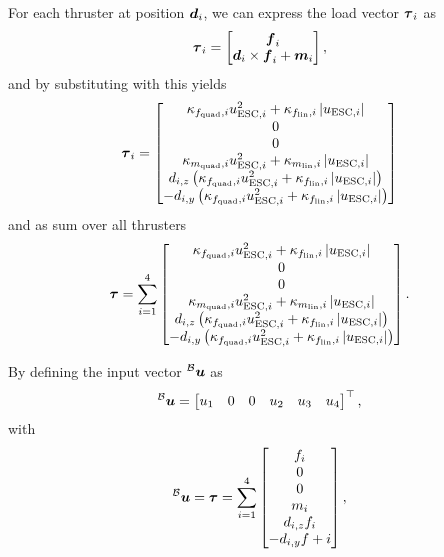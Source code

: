 For each thruster at position $\mbox{$\bm{d}$}_{i}$, we can express the load vector $\mbox{$\bm{\tau}$}_{i}$ as
\begin{equation}
	\label{eq:load-per-thruster-short}
	\mbox{$\bm{\tau}$}_{i} = 
	\begin{bmatrix}
		\mbox{$\bm{f}$}_i \\
		\mbox{$\bm{d}$}_i \times \mbox{$\bm{f}$}_i + \mbox{$\bm{m}$}_i
	\end{bmatrix}
	,
\end{equation}
and by substituting with  this yields
\begin{equation}
	\mbox{$\bm{\tau}$}_{i} = 
	\begin{bmatrix}
		\kappa_{f_{\text{quad}}, i} u_{\text{ESC},i}^2
		+ \kappa_{f_{\text{lin}}, i} \left\lvert u_{\text{ESC},i} \right\rvert
		\\
		0 \\
		0 \\
		\kappa_{m_{\text{quad}}, i} u_{\text{ESC},i}^2
		+ \kappa_{m_{\text{lin}}, i} \left\lvert u_{\text{ESC},i} \right\rvert
		\\
		d_{i,z}
		\left(
			\kappa_{f_{\text{quad}}, i} u_{\text{ESC},i}^2
			+ \kappa_{f_{\text{lin}}, i} \left\lvert u_{\text{ESC},i} \right\rvert
		\right)
		\\
		-d_{i,y}
		\left(
			\kappa_{f_{\text{quad}}, i} u_{\text{ESC},i}^2
			+ \kappa_{f_{\text{lin}}, i} \left\lvert u_{\text{ESC},i} \right\rvert
		\right)
	\end{bmatrix}
\end{equation}
and as sum over all thrusters
\begin{equation}
	\mbox{$\bm{\tau}$} = 
	\sum_{i=1}^{4}
	\begin{bmatrix}
		\kappa_{f_{\text{quad}}, i} u_{\text{ESC},i}^2
		+ \kappa_{f_{\text{lin}}, i} \left\lvert u_{\text{ESC},i} \right\rvert
		\\
		0 \\
		0 \\
		\kappa_{m_{\text{quad}}, i} u_{\text{ESC},i}^2
		+ \kappa_{m_{\text{lin}}, i} \left\lvert u_{\text{ESC},i} \right\rvert
		\\
		d_{i,z}
		\left(
			\kappa_{f_{\text{quad}}, i} u_{\text{ESC},i}^2
			+ \kappa_{f_{\text{lin}}, i} \left\lvert u_{\text{ESC},i} \right\rvert
		\right)
		\\
		-d_{i,y}
		\left(
			\kappa_{f_{\text{quad}}, i} u_{\text{ESC},i}^2
			+ \kappa_{f_{\text{lin}}, i} \left\lvert u_{\text{ESC},i} \right\rvert
		\right)
	\end{bmatrix}
	.
\end{equation}

By defining the input vector $\prescript{\mathcal{B}}{}{\mbox{$\bm{u}$}}$ as
\begin{equation}
	\label{eq:input-vector}
	\prescript{\mathcal{B}}{}{\mbox{$\bm{u}$}} =
	\begin{bmatrix}
		u_1 &
		0 &
		0 &
		u_2 &
		u_3 &
		u_4 
	\end{bmatrix}^\top
	,
\end{equation}
with
\begin{equation}
	\prescript{\mathcal{B}}{}{\mbox{$\bm{u}$}} = \mbox{$\bm{\tau}$} =
	\sum_{i=1}^{4}
	\begin{bmatrix}
		f_i \\
		0 \\
		0 \\
		m_i \\
		d_{i, z} f_i\\
		-d_{i, y} f+i
	\end{bmatrix}
	,
\end{equation}

